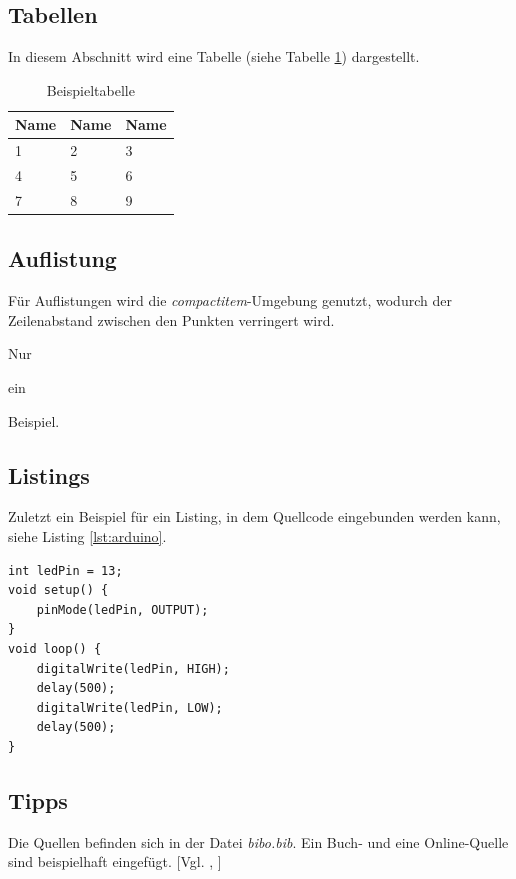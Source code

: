 \documentclass[12pt,a4paper,bibliography=totocnumbered,listof=totocnumbered]{scrartcl}
\begin{document}
\subsection{Tabellen}
In diesem Abschnitt wird eine Tabelle (siehe Tabelle \ref{tab:beispiel}) dargestellt.

\vspace{1em}
\begin{table}[!h]
	\centering
	\begin{tabular}{|l|l|l|}
		\hline
		\textbf{Name} & \textbf{Name} & \textbf{Name}\\
		\hline
		1 & 2 & 3\\
		\hline
		4 & 5 & 6\\
		\hline
		7 & 8 & 9\\
		\hline
	\end{tabular}
	\caption{Beispieltabelle}
	\label{tab:beispiel}
\end{table}

\pagebreak
\subsection{Auflistung}
Für Auflistungen wird die \textit{compactitem}-Umgebung genutzt, wodurch der Zeilenabstand zwischen den Punkten verringert wird.

\begin{compactitem}
	\item Nur
	\item ein
	\item Beispiel.
\end{compactitem}

\subsection{Listings}
Zuletzt ein Beispiel für ein Listing, in dem Quellcode eingebunden werden kann, siehe Listing \ref{lst:arduino}.

\vspace{1em}
\begin{lstlisting}[caption=Arduino Beispielprogramm, label=lst:arduino]
int ledPin = 13;
void setup() {
    pinMode(ledPin, OUTPUT);
}
void loop() {
    digitalWrite(ledPin, HIGH);
    delay(500);
    digitalWrite(ledPin, LOW);
    delay(500);
}
\end{lstlisting}

\subsection{Tipps}
Die Quellen befinden sich in der Datei \textit{bibo.bib}. Ein Buch- und eine Online-Quelle sind beispielhaft eingefügt. [Vgl. \cite{buch}, \cite{online}]
\end{document}
